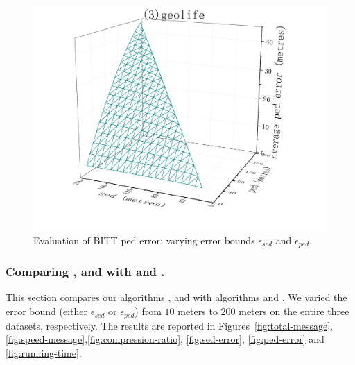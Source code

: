 {\begin{figure}[tb!]
	\includegraphics[scale = 0.210]{figures/Fig-BITT-geolife-ped-error.png}\hspace{1ex}
	\caption{\small Evaluation of BITT ped error: varying error bounds $\epsilon_{sed}$ and $\epsilon_{ped}$.}
	\label{fig:bitt-ped-error}
\end{figure}





\subsubsection{Comparing \bitt, \sitt and \citt with \ldrh and \grts.}
This section compares our algorithms \citt, \sitt and \bitt with algorithms \ldrh and \grts.
We varied the error bound (either $\epsilon_{sed}$ or $\epsilon_{ped}$) from $10$ meters to $200$ meters on the entire three datasets, respectively. 
%
The results are reported in Figures~\ref{fig:total-message}, \ref{fig:speed-message},\ref{fig:compression-ratio}, \ref{fig:sed-error}, \ref{fig:ped-error} and \ref{fig:running-time}.


}
